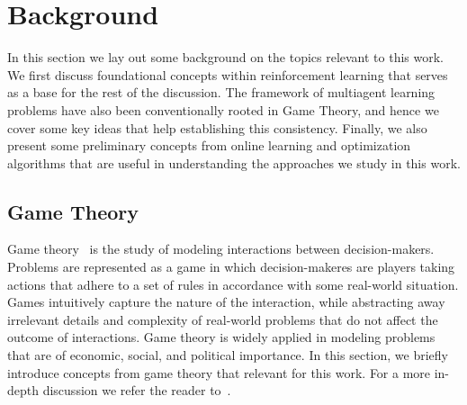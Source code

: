 \chapter{Background}
In this section we lay out some background on the topics relevant to this work.
We first discuss foundational concepts within reinforcement learning that serves as a base for the
rest of the discussion.
The framework of multiagent learning problems have also been conventionally rooted in Game Theory,
and hence we cover some key ideas that help establishing this consistency.
Finally, we also present some preliminary concepts from online learning and optimization algorithms
that are useful in understanding the approaches we study in this work.

\section{Game Theory}

Game theory~\cite{osborneintroduction2004} is the study of modeling interactions between
decision-makers.
Problems are represented as a game in which decision-makeres are players taking actions that adhere
to a set of rules in accordance with some real-world situation.
Games intuitively capture the nature of the interaction, while abstracting away irrelevant details
and complexity of real-world problems that do not affect the outcome of interactions.
Game theory is widely applied in modeling problems that are of economic, social, and political
importance.
In this section, we briefly introduce concepts from game theory that relevant for this work.
For a more in-depth discussion we refer the reader
to~\cite{shohamMultiagent2008,nisanAlgorithmic2007a}.

